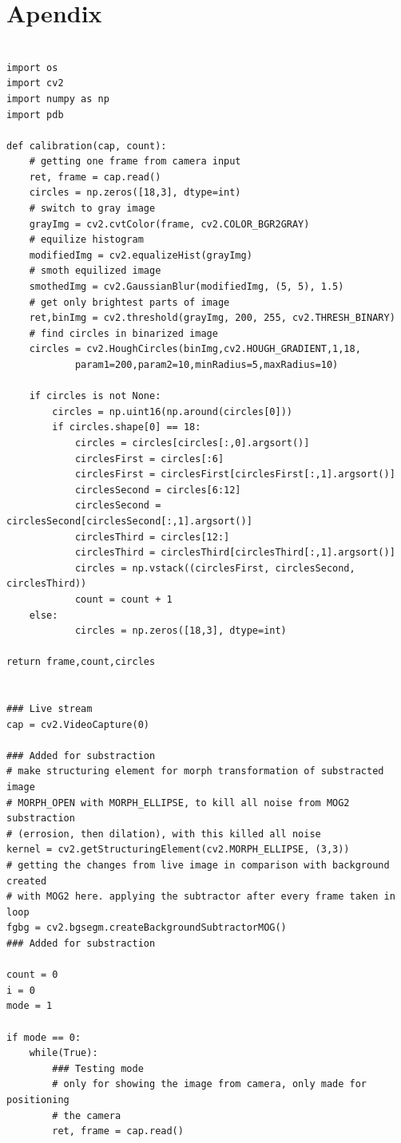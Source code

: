 \documentclass[a4paper,12pt, projekat]{etf}
\begin{document}
        \chapter{Apendix}

\begin{verbatim}

import os
import cv2
import numpy as np
import pdb

def calibration(cap, count):
    # getting one frame from camera input
    ret, frame = cap.read()
    circles = np.zeros([18,3], dtype=int)
    # switch to gray image
    grayImg = cv2.cvtColor(frame, cv2.COLOR_BGR2GRAY)
    # equilize histogram
    modifiedImg = cv2.equalizeHist(grayImg)
    # smoth equilized image
    smothedImg = cv2.GaussianBlur(modifiedImg, (5, 5), 1.5)
    # get only brightest parts of image
    ret,binImg = cv2.threshold(grayImg, 200, 255, cv2.THRESH_BINARY)
    # find circles in binarized image
    circles = cv2.HoughCircles(binImg,cv2.HOUGH_GRADIENT,1,18,
            param1=200,param2=10,minRadius=5,maxRadius=10)

    if circles is not None:
        circles = np.uint16(np.around(circles[0]))
        if circles.shape[0] == 18:
            circles = circles[circles[:,0].argsort()]
            circlesFirst = circles[:6]
            circlesFirst = circlesFirst[circlesFirst[:,1].argsort()]
            circlesSecond = circles[6:12]
            circlesSecond = circlesSecond[circlesSecond[:,1].argsort()]
            circlesThird = circles[12:]
            circlesThird = circlesThird[circlesThird[:,1].argsort()]
            circles = np.vstack((circlesFirst, circlesSecond, circlesThird))
            count = count + 1
    else:
            circles = np.zeros([18,3], dtype=int)

return frame,count,circles


### Live stream
cap = cv2.VideoCapture(0)

### Added for substraction
# make structuring element for morph transformation of substracted image
# MORPH_OPEN with MORPH_ELLIPSE, to kill all noise from MOG2 substraction
# (errosion, then dilation), with this killed all noise
kernel = cv2.getStructuringElement(cv2.MORPH_ELLIPSE, (3,3))
# getting the changes from live image in comparison with background created
# with MOG2 here. applying the subtractor after every frame taken in loop
fgbg = cv2.bgsegm.createBackgroundSubtractorMOG()
### Added for substraction

count = 0
i = 0
mode = 1

if mode == 0:
    while(True):
        ### Testing mode
        # only for showing the image from camera, only made for positioning
        # the camera
        ret, frame = cap.read()


\end{verbatim}
\end{document}
